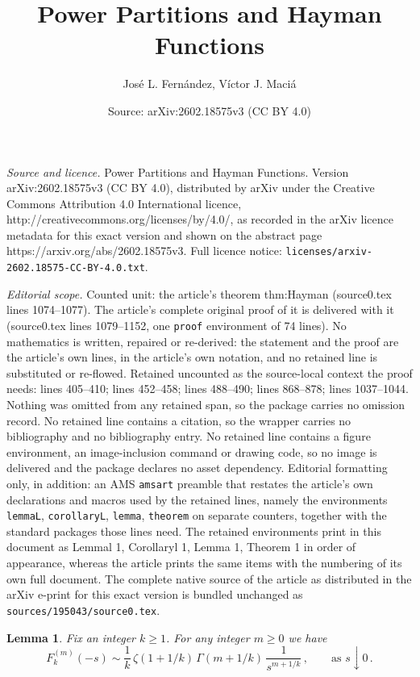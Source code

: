\documentclass[10pt,a4paper]{amsart}
\title{Power Partitions and Hayman Functions}
\author{Jos\'e L. Fern\'andez, V\'ictor J. Maci\'a}
\date{Source: arXiv:2602.18575v3 (CC BY 4.0)}
\newtheorem{lemmaL}{Lemma}
\begin{document}
\maketitle

\noindent\emph{Source and licence.} Power Partitions and Hayman Functions. Version arXiv:2602.18575v3 (CC BY 4.0), distributed by arXiv under the Creative Commons Attribution 4.0 International licence, http://creativecommons.org/licenses/by/4.0/, as recorded in the arXiv licence metadata for this exact version and shown on the abstract page https://arxiv.org/abs/2602.18575v3. Full licence notice: \texttt{licenses/arxiv-2602.18575-CC-BY-4.0.txt}.\par\smallskip

\noindent\textit{Editorial scope.} Counted unit: the article's theorem thm:Hayman (source0.tex lines 1074--1077). The article's complete original proof of it is delivered with it (source0.tex lines 1079--1152, one \texttt{proof} environment of 74 lines). No mathematics is written, repaired or re-derived: the statement and the proof are the article's own lines, in the article's own notation, and no retained line is substituted or re-flowed.  Retained uncounted as the source-local context the proof needs: lines 405--410; lines 452--458; lines 488--490; lines 868--878; lines 1037--1044.  Nothing was omitted from any retained span, so the package carries no omission record.  No retained line contains a citation, so the wrapper carries no bibliography and no bibliography entry.  No retained line contains a figure environment, an image-inclusion command or drawing code, so no image is delivered and the package declares no asset dependency.  Editorial formatting only, in addition: an AMS \texttt{amsart} preamble that restates the article's own declarations and macros used by the retained lines, namely the environments \texttt{lemmaL}, \texttt{corollaryL}, \texttt{lemma}, \texttt{theorem} on separate counters, together with the standard packages those lines need.  The retained environments print in this document as Lemmal 1, Corollaryl 1, Lemma 1, Theorem 1 in order of appearance, whereas the article prints the same items with the numbering of its own full document.  The complete native source of the article as distributed in the arXiv e-print for this exact version is bundled unchanged as \texttt{sources/195043/source0.tex}.
\begin{lemmaL}\label{lem:asympt derivatives Fk}
Fix an integer $k\ge 1$. For any integer $m\ge 0$ we have
\[
F_k^{(m)}(-s) \sim \frac{1}{k}\,\zeta(1+1/k)\,\Gamma(m+1/k)\,\frac{1}{s^{m+1/k}}\,, \qquad \text{as } s\downarrow 0\,.
\]
\end{lemmaL}
\end{document}
